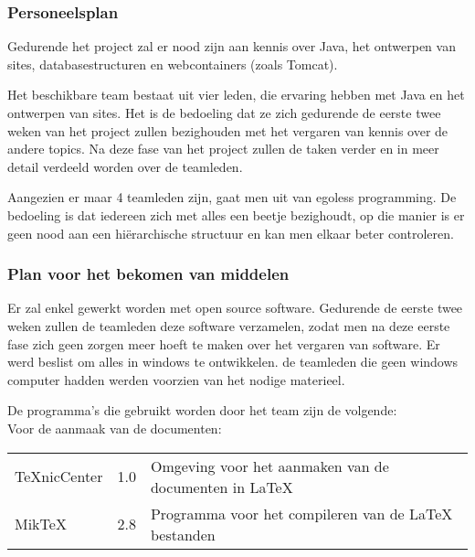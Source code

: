 \documentclass{article}
\begin{document}
\subsubsection{Personeelsplan}

Gedurende het project zal er nood zijn aan kennis over Java, het ontwerpen van sites, databasestructuren en  webcontainers (zoals Tomcat). 

Het beschikbare team bestaat uit vier leden, die ervaring hebben met Java en het ontwerpen van sites. Het is de bedoeling dat ze zich gedurende de eerste twee weken van het project zullen bezighouden met het vergaren van kennis over de andere topics. Na deze fase van het project zullen de taken verder en in meer detail verdeeld worden over de teamleden.

Aangezien er maar 4 teamleden zijn, gaat men uit van egoless programming. De bedoeling is dat iedereen zich met alles een beetje bezighoudt, op die manier is er geen nood aan een hi\"{e}rarchische structuur en kan men elkaar beter controleren. 

\subsubsection{Plan voor het bekomen van middelen}

Er zal enkel gewerkt worden met open source software. Gedurende de eerste twee weken zullen de teamleden deze software verzamelen, zodat men na deze eerste fase zich geen zorgen meer hoeft te maken over het vergaren van software. Er werd beslist om alles in windows te ontwikkelen. de teamleden die geen windows computer hadden werden voorzien van het nodige materieel.

De programma's die gebruikt worden door het team zijn de volgende: \\

Voor de aanmaak van de documenten:
\begin{center}
\begin{tabular}{|p{4cm}|p{1.5cm}|p{6cm}|}
\hline
TeXnicCenter & 1.0 & Omgeving voor het aanmaken van de documenten in LaTeX \\
\hdashline[1pt/5pt] 
MikTeX & 2.8 & Programma voor het compileren van de LaTeX bestanden  \\
\hline
\end{tabular}
\end{center}
\end{document}
